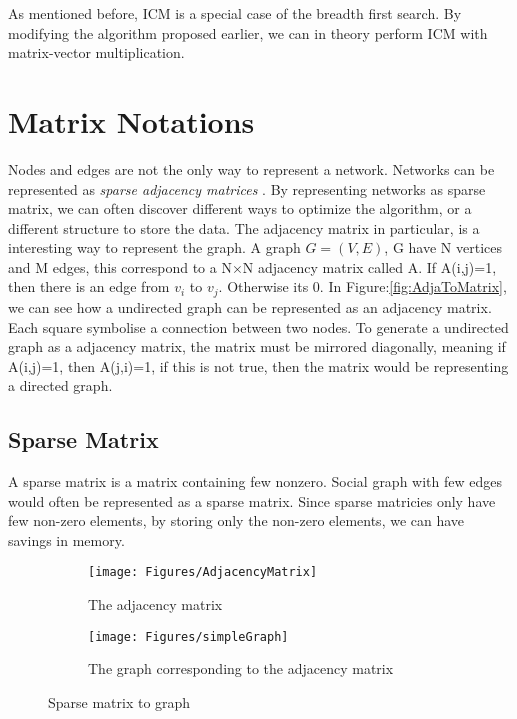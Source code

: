 As mentioned before, ICM is a special case of the breadth first search. By modifying the algorithm proposed earlier, we can in theory perform ICM with matrix-vector multiplication.  

\section{Matrix Notations}
Nodes and edges are not the only way to represent a network. Networks can be represented as \textit{sparse adjacency matrices} \cite{AlgoToMath} \cite{McAndrew1963}. By representing networks as sparse matrix, we can often discover different ways to optimize the algorithm, or a different structure to store the data. The adjacency matrix in particular, is a interesting way to represent the graph. A graph $G =(V,E)$, G have N vertices and M edges, this correspond to a N$\times$N adjacency matrix called A. If A(i,j)=1, then there is an edge from $v_i$ to $v_j$. Otherwise its 0. In Figure:\ref{fig:AdjaToMatrix}, we can see how a undirected graph can be represented as an adjacency matrix. Each square symbolise a connection between two nodes. To generate a undirected graph as a adjacency matrix, the matrix must be mirrored diagonally, meaning if A(i,j)=1, then A(j,i)=1, if this is not true, then the matrix would be representing a directed graph.

\subsection{Sparse Matrix}
A sparse matrix is a matrix containing few nonzero. Social graph with few edges would often be represented as a sparse matrix. Since sparse matricies only have few non-zero elements, by storing only the non-zero elements, we can have savings in memory.

\begin{figure}
	\begin{subfigure}{0.5\textwidth}
	\texttt{[image: Figures/AdjacencyMatrix]}
	\caption{The adjacency matrix}
	\label{fig:AdjacencyM}
	\end{subfigure}
	\begin{subfigure}{0.5\textwidth}
	\texttt{[image: Figures/simpleGraph]}
	\caption{The graph corresponding to the adjacency matrix}
	\label{fig:matrix}
	\end{subfigure}
 	\caption{Sparse matrix to graph}
 	\label{AdjaToMatrix}
\end{figure}

